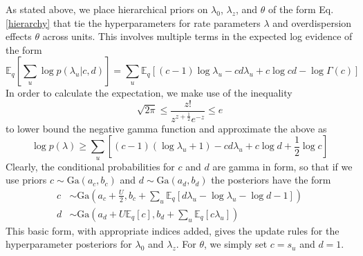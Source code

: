 \documentclass[10pt,letterpaper]{article}
\begin{document}
As stated above, we place hierarchical priors on $\lambda_0$, $\lambda_z$, and $\theta$ of the form Eq. \ref{hierarchy} that tie the hyperparameters for rate parameters $\lambda$ and overdispersion effects $\theta$ across units.  This involves multiple terms in the expected log evidence of the form
\begin{equation}
    \mathbb{E}_q \left[\sum_u \log p(\lambda_u|c, d)\right] = \sum_u \mathbb{E}_q \left[ 
    (c - 1) \log \lambda_u - cd\lambda_u + c \log cd - \log \Gamma(c) 
    \right] 
\end{equation}
In order to calculate the expectation, we make use of the inequality %
\begin{equation}
    \sqrt{2\pi} \le \frac{z!}{z^{z+\frac{1}{2}} e^{-z}} \le e
\end{equation}
to lower bound the negative gamma function and approximate the above as
\begin{equation}
    \log p(\lambda) \ge \sum_u \left[ 
    (c - 1) (\log \lambda_u + 1) - cd\lambda_u + c \log d + \frac{1}{2}\log c\right]
\end{equation}
Clearly, the conditional probabilities for $c$ and $d$ are gamma in form, so that if we use priors $c \sim \text{Ga}(a_c, b_c)$ and $d\sim \text{Ga}(a_d, b_d)$ the posteriors have the form
\begin{align}
    c &\sim \text{Ga}\left(a_c + \frac{U}{2}, 
    b_c + \sum_u\mathbb{E}_q 
        \left[d \lambda_u - \log \lambda_u - \log d - 1\right]\right) \\
    d &\sim \text{Ga}\left(
        a_d + U\mathbb{E}_q[c], b_d + \sum_u \mathbb{E}_q [c \lambda_u]
    \right)
\end{align}
This basic form, with appropriate indices added, gives the update rules for the hyperparameter posteriors for $\lambda_0$ and $\lambda_z$. For $\theta$, we simply set $c = s_u$ and $d = 1$.
\end{document}
